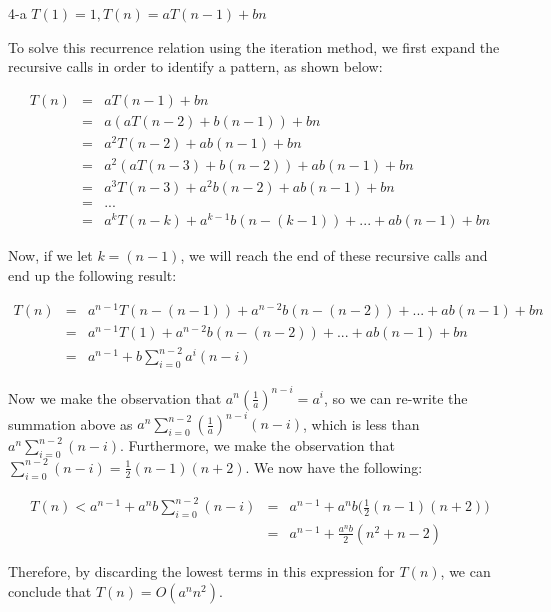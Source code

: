 \documentclass[11pt]{article}
\begin{document}
\begin{prob}{4-a}
$T(1) = 1, T(n) = aT(n-1) + bn$
\end{prob}
\begin{sol} 

To solve this recurrence relation using the iteration method, we first expand the recursive calls in order to identify a pattern, as shown below:

\begin{eqnarray*}
T(n) & = & aT(n-1) + bn \\
& = & a(aT(n-2) + b(n-1)) + bn \\
& = & a^2T(n-2) + ab(n-1) + bn\\
& = & a^2(aT(n-3) + b(n-2)) + ab(n-1) + bn\\
& = & a^3T(n-3) + a^2b(n-2) + ab(n-1) + bn \\
& = & ... \\
& = & a^kT(n-k) + a^{k-1}b(n-(k-1)) + ... + ab(n-1) + bn
\end{eqnarray*}

Now, if we let $k = (n-1)$, we will reach the end of these recursive calls and end up the following result:

\begin{eqnarray*}
T(n) & = & a^{n-1}T(n-(n-1)) + a^{n-2}b(n-(n-2)) + ... + ab(n-1) + bn \\
& = & a^{n-1}T(1) + a^{n-2}b(n-(n-2)) + ... + ab(n-1) + bn \\
& = & a^{n-1} + b\sum_{i=0}^{n-2} a^i(n-i)
\end{eqnarray*}

Now we make the observation that $a^n(\frac{1}{a})^{n-i} = a^{i}$, so we can re-write the summation above as $a^{n}\sum_{i=0}^{n-2} (\frac{1}{a})^{n-i}(n-i)$, which is less than $a^{n}\sum_{i=0}^{n-2} (n-i)$. Furthermore, we make the observation that $\sum_{i=0}^{n-2} (n-i) = \frac{1}{2} (n-1) (n+2)$. We now have the following:

\begin{eqnarray*}
T(n) < a^{n-1} + a^{n}b\sum_{i=0}^{n-2} (n-i) & = & a^{n-1} + a^{n}b\Big(\frac{1}{2} (n-1) (n+2) \Big) \\
& = & a^{n-1} + \frac{a^{n}b}{2}(n^2 + n - 2)
\end{eqnarray*}

Therefore, by discarding the lowest terms in this expression for $T(n)$, we can conclude that $T(n) = O(a^nn^2)$.

\end{sol}
\end{document}
